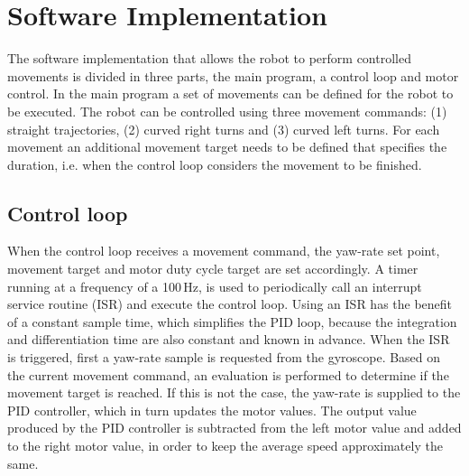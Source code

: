 


\section{Software Implementation}
\label{sec:dai_software_implementation}

The software implementation that allows the robot to perform controlled movements is divided in three parts, the main program, a control loop and motor control.
In the main program a set of movements can be defined for the robot to be executed.
The robot can be controlled using three movement commands: (1) straight trajectories, (2) curved right turns and (3) curved left turns.
For each movement an additional movement target needs to be defined that specifies the duration, i.e. when the control loop considers the movement to be finished.

\subsection{Control loop}

When the control loop receives a movement command, the yaw-rate set point, movement target and motor duty cycle target are set accordingly.
A timer running at a frequency of a 100\,Hz, is used to periodically call an interrupt service routine (ISR) and execute the control loop.
Using an ISR has the benefit of a constant sample time, which simplifies the PID loop, because the integration and differentiation time are also constant and known in advance.
When the ISR is triggered, first a yaw-rate sample is requested from the gyroscope.
Based on the current movement command, an evaluation is performed to determine if the movement target is reached.
If this is not the case, the yaw-rate is supplied to the PID controller, which in turn updates the motor values.
The output value produced by the PID controller is subtracted from the left motor value and added to the right motor value, in order to keep the average speed approximately the same.

